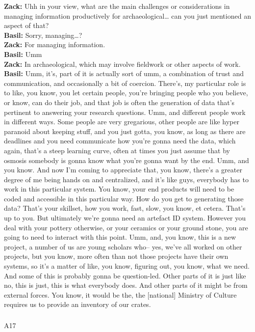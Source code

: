 \documentclass[
  canadian,
]{article}
\makeatletter
\let\oldsubparagraph\subparagraph
\renewcommand{\subparagraph}{
    \@ifstar
      \xxxSubParagraphStar
      \xxxSubParagraphNoStar
  }
\newcommand{\xxxSubParagraphStar}[1]{\oldsubparagraph*{#1}\mbox{}}
\newcommand{\xxxSubParagraphNoStar}[1]{\oldsubparagraph{#1}\mbox{}}
\makeatother
\begin{document}
\textbf{Zack:} Uhh in your view, what are the main challenges or
considerations in managing information productively for
archaeological\ldots{} can you just mentioned an aspect of that?\\
\textbf{Basil:} Sorry, managing\ldots?\\
\textbf{Zack:} For managing information.\\
\textbf{Basil:} Umm\\
\textbf{Zack:} In archaeological, which may involve fieldwork or other
aspects of work.\\
\textbf{Basil:} Umm, it's, part of it is actually sort of umm, a
combination of trust and communication, and occasionally a bit of
coercion. There's, my particular role is to like, you know, you let
certain people, you're bringing people who you believe, or know, can do
their job, and that job is often the generation of data that's pertinent
to answering your research questions. Umm, and different people work in
different ways. Some people are very gregarious, other people are like
hyper paranoid about keeping stuff, and you just gotta, you know, as
long as there are deadlines and you need communicate how you're gonna
need the data, which again, that's a steep learning curve, often at
times you just assume that by osmosis somebody is gonna know what you're
gonna want by the end. Umm, and you know. And now I'm coming to
appreciate that, you know, there's a greater degree of me being hands on
and centralized, and it's like guys, everybody has to work in this
particular system. You know, your end products will need to be coded and
accessible in this particular way. How do you get to generating those
data? That's your skillset, how you work, fast, slow, you know, et
cetera. That's up to you. But ultimately we're gonna need an artefact ID
system. However you deal with your pottery otherwise, or your ceramics
or your ground stone, you are going to need to interact with this point.
Umm, and, you know, this is a new project, a number of us are young
scholars who-- yes, we've all worked on other projects, but you know,
more often than not those projects have their own systems, so it's a
matter of like, you know, figuring out, you know, what we need. And some
of this is probably gonna be question-led. Other parts of it is just
like no, this is just, this is what everybody does. And other parts of
it might be from external forces. You know, it would be the, the
{[}national{]} Ministry of Culture requires us to provide an inventory
of our crates.

\subparagraph{A17}\label{sec-A17}
\end{document}

